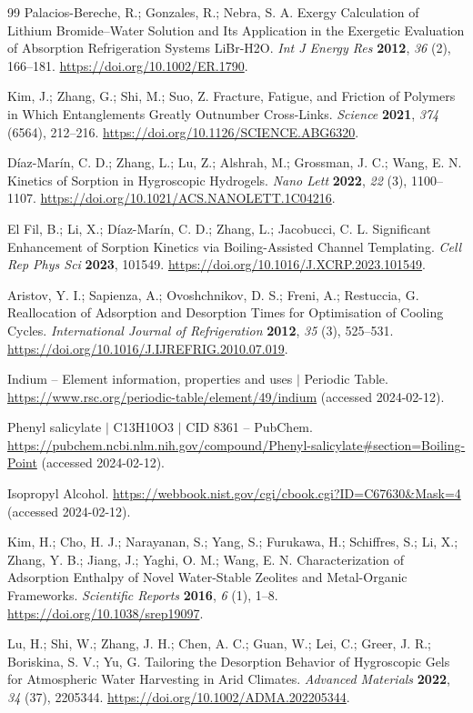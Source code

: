 \documentclass[11pt]{article}
\begin{document}
\begin{thebibliography}{99}
 Palacios-Bereche, R.; Gonzales, R.; Nebra, S. A. Exergy Calculation of Lithium Bromide--Water Solution and Its Application in the Exergetic Evaluation of Absorption Refrigeration Systems LiBr-H2O. \textit{Int J Energy Res} \textbf{2012}, \textit{36} (2), 166--181. \url{https://doi.org/10.1002/ER.1790}.

 Kim, J.; Zhang, G.; Shi, M.; Suo, Z. Fracture, Fatigue, and Friction of Polymers in Which Entanglements Greatly Outnumber Cross-Links. \textit{Science} \textbf{2021}, \textit{374} (6564), 212--216. \url{https://doi.org/10.1126/SCIENCE.ABG6320}.

 D\'iaz-Mar\'in, C. D.; Zhang, L.; Lu, Z.; Alshrah, M.; Grossman, J. C.; Wang, E. N. Kinetics of Sorption in Hygroscopic Hydrogels. \textit{Nano Lett} \textbf{2022}, \textit{22} (3), 1100--1107. \url{https://doi.org/10.1021/ACS.NANOLETT.1C04216}.

 El Fil, B.; Li, X.; D\'iaz-Mar\'in, C. D.; Zhang, L.; Jacobucci, C. L. Significant Enhancement of Sorption Kinetics via Boiling-Assisted Channel Templating. \textit{Cell Rep Phys Sci} \textbf{2023}, 101549. \url{https://doi.org/10.1016/J.XCRP.2023.101549}.

 Aristov, Y. I.; Sapienza, A.; Ovoshchnikov, D. S.; Freni, A.; Restuccia, G. Reallocation of Adsorption and Desorption Times for Optimisation of Cooling Cycles. \textit{International Journal of Refrigeration} \textbf{2012}, \textit{35} (3), 525--531. \url{https://doi.org/10.1016/J.IJREFRIG.2010.07.019}.

 Indium -- Element information, properties and uses $\vert$ Periodic Table. \url{https://www.rsc.org/periodic-table/element/49/indium} (accessed 2024-02-12).

 Phenyl salicylate $\vert$ C13H10O3 $\vert$ CID 8361 -- PubChem. \url{https://pubchem.ncbi.nlm.nih.gov/compound/Phenyl-salicylate\#section=Boiling-Point} (accessed 2024-02-12).

 Isopropyl Alcohol. \url{https://webbook.nist.gov/cgi/cbook.cgi?ID=C67630&Mask=4} (accessed 2024-02-12).

 Kim, H.; Cho, H. J.; Narayanan, S.; Yang, S.; Furukawa, H.; Schiffres, S.; Li, X.; Zhang, Y. B.; Jiang, J.; Yaghi, O. M.; Wang, E. N. Characterization of Adsorption Enthalpy of Novel Water-Stable Zeolites and Metal-Organic Frameworks. \textit{Scientific Reports} \textbf{2016}, \textit{6} (1), 1--8. \url{https://doi.org/10.1038/srep19097}.

 Lu, H.; Shi, W.; Zhang, J. H.; Chen, A. C.; Guan, W.; Lei, C.; Greer, J. R.; Boriskina, S. V.; Yu, G. Tailoring the Desorption Behavior of Hygroscopic Gels for Atmospheric Water Harvesting in Arid Climates. \textit{Advanced Materials} \textbf{2022}, \textit{34} (37), 2205344. \url{https://doi.org/10.1002/ADMA.202205344}.

\end{thebibliography}
\end{document}

